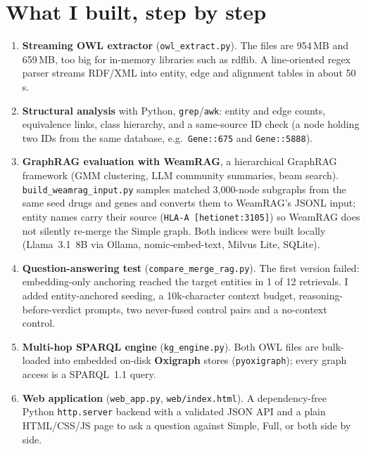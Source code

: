 \documentclass[10pt,a4paper]{article}
\newcommand{\code}[1]{\texttt{\small #1}}
\begin{document}
\section{What I built, step by step}
\begin{enumerate}
\item \textbf{Streaming OWL extractor} (\code{owl\_extract.py}). The files are 954\,MB and 659\,MB, too big for in-memory libraries such as rdflib. A line-oriented regex parser streams RDF/XML into entity, edge and alignment tables in about 50\,s.
\item \textbf{Structural analysis} with Python, \code{grep}/\code{awk}: entity and edge counts, equivalence links, class hierarchy, and a same-source ID check (a node holding two IDs from the same database, e.g.\ \code{Gene::675} and \code{Gene::5888}).
\item \textbf{GraphRAG evaluation with WeamRAG}, a hierarchical GraphRAG framework (GMM clustering, LLM community summaries, beam search). \code{build\_weamrag\_input.py} samples matched 3,000-node subgraphs from the same seed drugs and genes and converts them to WeamRAG's JSONL input; entity names carry their source (\code{HLA-A [hetionet:3105]}) so WeamRAG does not silently re-merge the Simple graph. Both indices were built locally (Llama~3.1~8B via Ollama, nomic-embed-text, Milvus Lite, SQLite).
\item \textbf{Question-answering test} (\code{compare\_merge\_rag.py}). The first version failed: embedding-only anchoring reached the target entities in 1 of 12 retrievals. I added entity-anchored seeding, a 10k-character context budget, reasoning-before-verdict prompts, two never-fused control pairs and a no-context control.
\item \textbf{Multi-hop SPARQL engine} (\code{kg\_engine.py}). Both OWL files are bulk-loaded into embedded on-disk \textbf{Oxigraph} stores (\code{pyoxigraph}); every graph access is a SPARQL~1.1 query.
\item \textbf{Web application} (\code{web\_app.py}, \code{web/index.html}). A dependency-free Python \code{http.server} backend with a validated JSON API and a plain HTML/CSS/JS page to ask a question against Simple, Full, or both side by side.
\end{enumerate}
\end{document}
